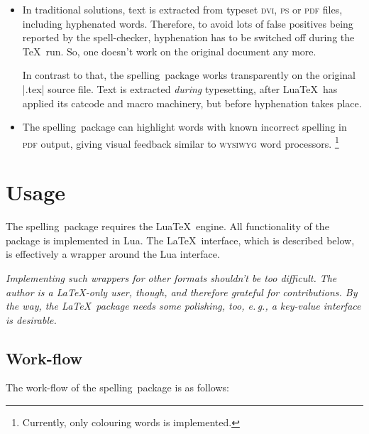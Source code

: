 \documentclass[11pt]{article}
\newcommand*{\pkg}{\textsf{spelling}}
\newcommand*{\acr}[1]{\mbox{\scshape#1}}
\newcommand*{\latinphrase}[1]{\foreignlanguage{latin}{\emph{#1}}}
\newcommand*{\lpeg}{\latinphrase{e.\,g.}\xspace}
\begin{document}
\begin{itemize}

\item In traditional solutions, text is extracted from typeset
  \acr{dvi}, \acr{ps} or \acr{pdf} files, including hyphenated words.
  Therefore, to avoid lots of false positives being reported by the
  spell-checker, hyphenation has to be switched off during the \TeX\
  run. So, one doesn't work on the original document any more.

  In contrast to that, the \pkg\ package works transparently on the
  original |.tex| source file.  Text is extracted \emph{during}
  typesetting, after Lua\TeX\ has applied its catcode and macro
  machinery, but before hyphenation takes place.

\item The \pkg\ package can highlight words with known incorrect
  spelling in \acr{pdf} output, giving visual feedback similar to
  \acr{wysiwyg} word processors.%
  \footnote{Currently, only colouring words is implemented.}

\end{itemize}


\section{Usage}
\label{sec:usage}

The \pkg\ package requires the Lua\TeX\ engine.  All functionality of
the package is implemented in Lua.  The \LaTeX\ interface, which is
described below, is effectively a wrapper around the Lua interface.

\emph{Implementing such wrappers for other formats shouldn't be too
  difficult.  The author is a \LaTeX-only user, though, and therefore
  grateful for contributions.  By the way, the \LaTeX\ package needs
  some polishing, too, \lpeg, a key-value interface is desirable.}


\subsection{Work-flow}
\label{sec:work-flow}

The work-flow of the \pkg\ package is as follows:
\end{document}
